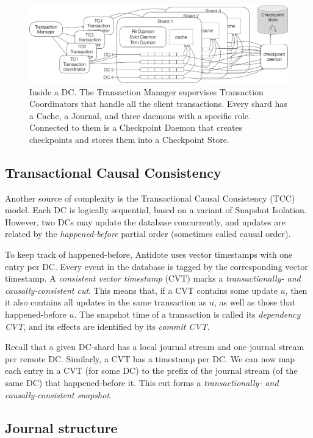 \documentclass[twoside]{article}
\begin{document}
\begin{figure}[tp]
  \centering
  \includegraphics[width=1\textwidth]{figures/insidedc.png}
  \caption{\label{fig:insidedc}
  Inside a DC. The Transaction Manager supervises Transaction 
  Coordinators that handle all the client transactions. Every shard has a 
  Cache, a Journal, and three daemons with a specific role. Connected to 
  them is a Checkpoint Daemon that creates checkpoints and stores them 
  into a Checkpoint Store.}
\end{figure}

\subsection{Transactional Causal Consistency}
\label{sec:tcc}

Another source of complexity is the Transactional Causal Consistency
(TCC) model.
Each DC is logically sequential, based on a variant of Snapshot
Isolation.
However, two DCs may update the database concurrently, and updates are
related by the \emph{happened-before} partial order (sometimes called
causal order).

To keep track of happened-before, Antidote uses vector
timestamps with one entry per DC\@.
Every event in the database is tagged by the corresponding vector
timestamp.
A \emph{consistent vector timestamp} (CVT) marks a \emph{transactionally- and
causally-consistent cut}.
This means that, if a CVT contains some update $u$, then it also contains all
updates in the same transaction as $u$, as well as those that
happened-before $u$. 
The snapshot time of a transaction is called its \emph{dependency
CVT}, and its effects are identified by its \emph{commit CVT}.

Recall that a given DC-shard has a local journal stream and one journal
stream per remote DC\@.
Similarly, a CVT has a timestamp per DC\@.
We can now map each entry in a CVT (for some DC) to the prefix of the
journal stream (of the same DC) that happened-before it.
This cut forms a \emph{transactionally- and causally-consistent snapshot}.

\subsection{Journal structure}
\label{sec:journal}
\end{document}
